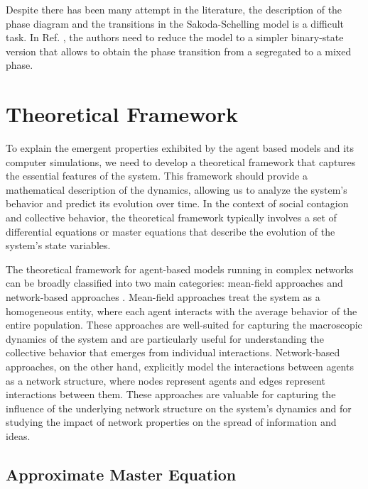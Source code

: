 Despite there has been many attempt in the literature, the description of the phase diagram and the transitions in the Sakoda-Schelling model is a difficult task. In Ref. \cite{lucquiaud2022modeliser}, the authors need to reduce the model to a simpler binary-state version that allows to obtain the phase transition from a segregated to a mixed phase.

\section{\label{sec:Theoretical Framework} Theoretical Framework}

To explain the emergent properties exhibited by the agent based models and its computer simulations, we need to develop a theoretical framework that captures the essential features of the system. This framework should provide a mathematical description of the dynamics, allowing us to analyze the system's behavior and predict its evolution over time. In the context of social contagion and collective behavior, the theoretical framework typically involves a set of differential equations or master equations that describe the evolution of the system's state variables.

The theoretical framework for agent-based models running in complex networks can be broadly classified into two main categories: mean-field approaches and network-based approaches \cite{barrat-2008}. Mean-field approaches treat the system as a homogeneous entity, where each agent interacts with the average behavior of the entire population. These approaches are well-suited for capturing the macroscopic dynamics of the system and are particularly useful for understanding the collective behavior that emerges from individual interactions. Network-based approaches, on the other hand, explicitly model the interactions between agents as a network structure, where nodes represent agents and edges represent interactions between them. These approaches are valuable for capturing the influence of the underlying network structure on the system's dynamics and for studying the impact of network properties on the spread of information and ideas.

\subsection{\label{sec:Approximate Master Equation} Approximate Master Equation}

